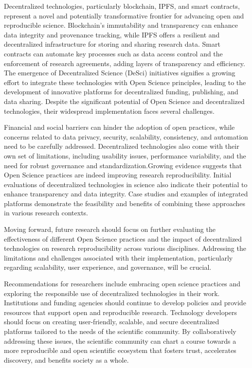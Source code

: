 Decentralized technologies, particularly blockchain, IPFS, and smart contracts, represent a novel and potentially transformative frontier for advancing open and reproducible science. Blockchain's immutability and transparency can enhance data integrity and provenance tracking, while IPFS offers a resilient and decentralized infrastructure for storing and sharing research data. Smart contracts can automate key processes such as data access control and the enforcement of research agreements, adding layers of transparency and efficiency. The emergence of Decentralized Science (DeSci) initiatives signifies a growing effort to integrate these technologies with Open Science principles, leading to the development of innovative platforms for decentralized funding, publishing, and data sharing. Despite the significant potential of Open Science and decentralized technologies, their widespread implementation faces several challenges.

Financial and social barriers can hinder the adoption of open practices, while concerns related to data privacy, security, scalability, consistency, and automation need to be carefully addressed. Decentralized technologies also come with their own set of limitations, including usability issues, performance variability, and the need for robust governance and standardization.Growing evidence suggests that Open Science practices are indeed improving research reproducibility. Initial evaluations of decentralized technologies in science also indicate their potential to enhance transparency and data integrity. Case studies and examples of integrated platforms demonstrate the feasibility and benefits of combining these approaches in various research contexts.

Moving forward, future research should focus on further evaluating the effectiveness of different Open Science practices and the impact of decentralized technologies on research reproducibility across various disciplines. Addressing the limitations and challenges associated with their implementation, particularly regarding scalability, user experience, and governance, will be crucial.

Recommendations for researchers include embracing open science practices and exploring the responsible use of decentralized technologies in their work. Institutions and funding agencies should continue to develop policies and provide resources that support open and reproducible research. Technology developers should focus on creating user-friendly, scalable, and secure decentralized platforms tailored to the needs of the scientific community. By collaboratively addressing these issues, the scientific community can chart a course towards a more reproducible and open scientific ecosystem that fosters trust, accelerates discovery, and benefits society as a whole.



